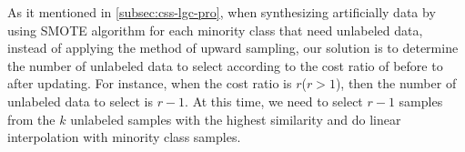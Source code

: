\documentclass{svjour3}                     %
\begin{document}
As it mentioned in \ref{subsec:css-lgc-pro}, when synthesizing artificially data by using SMOTE algorithm for each minority class that need unlabeled data, instead of applying the method of upward sampling, our solution is to determine the number of unlabeled data to select according to the cost ratio of before to after updating. For instance, when the cost ratio is $r$($r>1$), then the number of unlabeled data to select is $r-1$. At this time, we need to select $r-1$ samples from the $k$ unlabeled samples with the highest similarity and do linear interpolation with minority class samples.

\end{document}
